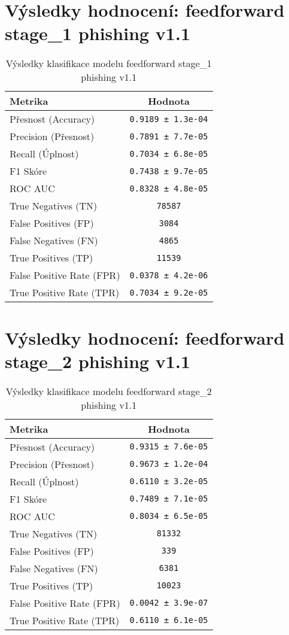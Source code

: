 \section*{Výsledky hodnocení: feedforward stage_1 phishing v1.1}
\begin{table}[h!]
\centering
\begin{tabular}{|l|c|}
\hline
\textbf{Metrika} & \textbf{Hodnota} \\
\hline
Přesnost (Accuracy) & \texttt{0.9189 ± 1.3e-04} \\
Precision (Přesnost) & \texttt{0.7891 ± 7.7e-05} \\
Recall (Úplnost) & \texttt{0.7034 ± 6.8e-05} \\
F1 Skóre & \texttt{0.7438 ± 9.7e-05} \\
ROC AUC & \texttt{0.8328 ± 4.8e-05} \\
True Negatives (TN) & \texttt{78587} \\
False Positives (FP) & \texttt{3084} \\
False Negatives (FN) & \texttt{4865} \\
True Positives (TP) & \texttt{11539} \\
False Positive Rate (FPR) & \texttt{0.0378 ± 4.2e-06} \\
True Positive Rate (TPR) & \texttt{0.7034 ± 9.2e-05} \\
\hline
\end{tabular}
\caption{Výsledky klasifikace modelu feedforward stage_1 phishing v1.1}
\label{tab:phishing_feedforward}
\end{table}

\section*{Výsledky hodnocení: feedforward stage_2 phishing v1.1}
\begin{table}[h!]
\centering
\begin{tabular}{|l|c|}
\hline
\textbf{Metrika} & \textbf{Hodnota} \\
\hline
Přesnost (Accuracy) & \texttt{0.9315 ± 7.6e-05} \\
Precision (Přesnost) & \texttt{0.9673 ± 1.2e-04} \\
Recall (Úplnost) & \texttt{0.6110 ± 3.2e-05} \\
F1 Skóre & \texttt{0.7489 ± 7.1e-05} \\
ROC AUC & \texttt{0.8034 ± 6.5e-05} \\
True Negatives (TN) & \texttt{81332} \\
False Positives (FP) & \texttt{339} \\
False Negatives (FN) & \texttt{6381} \\
True Positives (TP) & \texttt{10023} \\
False Positive Rate (FPR) & \texttt{0.0042 ± 3.9e-07} \\
True Positive Rate (TPR) & \texttt{0.6110 ± 6.1e-05} \\
\hline
\end{tabular}
\caption{Výsledky klasifikace modelu feedforward stage_2 phishing v1.1}
\label{tab:phishing_feedforward}
\end{table}

